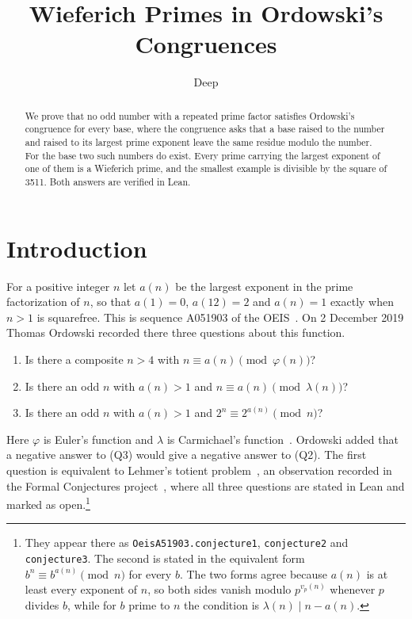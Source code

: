 \documentclass[11pt]{amsart}
\title{Wieferich Primes in Ordowski's Congruences}
\author{Deep}
\theoremstyle{remark}
\newcommand{\vp}{v_p}
\begin{document}
\begin{abstract}
We prove that no odd number with a repeated prime factor satisfies Ordowski's congruence for
every base, where the congruence asks that a base raised to the number and raised to its
largest prime exponent leave the same residue modulo the number. For the base two such
numbers do exist. Every prime carrying the largest exponent of one of them is a Wieferich
prime, and the smallest example is divisible by the square of 3511. Both answers are
verified in Lean.
\end{abstract}

\maketitle

\section{Introduction}

For a positive integer $n$ let $a(n)$ be the largest exponent in the prime factorization of
$n$, so that $a(1)=0$, $a(12)=2$ and $a(n)=1$ exactly when $n>1$ is squarefree. This is
sequence A051903 of the OEIS~\cite{oeis51903}. On 2 December 2019 Thomas Ordowski recorded
there three questions about this function.

\begin{enumerate}
\item[(Q1)] Is there a composite $n>4$ with $n\equiv a(n)\pmod{\varphi(n)}$?
\item[(Q2)] Is there an odd $n$ with $a(n)>1$ and $n\equiv a(n)\pmod{\lambda(n)}$?
\item[(Q3)] Is there an odd $n$ with $a(n)>1$ and $2^{n}\equiv 2^{a(n)}\pmod n$?
\end{enumerate}

Here $\varphi$ is Euler's function and $\lambda$ is Carmichael's function~\cite{carmichael}.
Ordowski added that a negative answer to (Q3) would give a negative answer to (Q2). The
first question is equivalent to Lehmer's totient problem~\cite{lehmer32}, an observation
recorded in the Formal Conjectures project~\cite{formalconj}, where all three questions are
stated in Lean and marked as open.\footnote{They appear there as
\texttt{OeisA51903.conjecture1}, \texttt{conjecture2} and \texttt{conjecture3}. The second is
stated in the equivalent form $b^n\equiv b^{a(n)}\pmod n$ for every $b$. The two forms agree
because $a(n)$ is at least every exponent of $n$, so both sides vanish modulo $p^{\vp(n)}$
whenever $p$ divides $b$, while for $b$ prime to $n$ the condition is $\lambda(n)\mid
n-a(n)$.}
\end{document}
